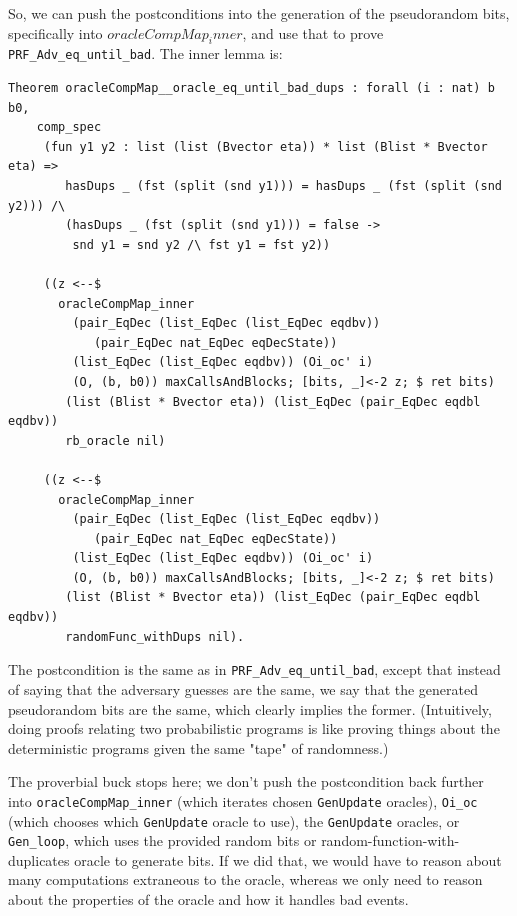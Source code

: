 \documentclass[12pt,lot, lof]{puthesis}
\newcommand{\li} {\lstinline}
\begin{document}
{So, we can push the postconditions into the generation of the pseudorandom bits, specifically into $oracleCompMap_inner$, and use that to prove \li|PRF_Adv_eq_until_bad|. The inner lemma is:

\begin{lstlisting}
Theorem oracleCompMap__oracle_eq_until_bad_dups : forall (i : nat) b b0,
    comp_spec
     (fun y1 y2 : list (list (Bvector eta)) * list (Blist * Bvector eta) =>
        hasDups _ (fst (split (snd y1))) = hasDups _ (fst (split (snd y2))) /\
        (hasDups _ (fst (split (snd y1))) = false ->
         snd y1 = snd y2 /\ fst y1 = fst y2))

     ((z <--$
       oracleCompMap_inner
         (pair_EqDec (list_EqDec (list_EqDec eqdbv))
            (pair_EqDec nat_EqDec eqDecState))
         (list_EqDec (list_EqDec eqdbv)) (Oi_oc' i) 
         (O, (b, b0)) maxCallsAndBlocks; [bits, _]<-2 z; $ ret bits)
        (list (Blist * Bvector eta)) (list_EqDec (pair_EqDec eqdbl eqdbv))
        rb_oracle nil)
         
     ((z <--$
       oracleCompMap_inner
         (pair_EqDec (list_EqDec (list_EqDec eqdbv))
            (pair_EqDec nat_EqDec eqDecState))
         (list_EqDec (list_EqDec eqdbv)) (Oi_oc' i) 
         (O, (b, b0)) maxCallsAndBlocks; [bits, _]<-2 z; $ ret bits)
        (list (Blist * Bvector eta)) (list_EqDec (pair_EqDec eqdbl eqdbv))
        randomFunc_withDups nil).
\end{lstlisting}        

The postcondition is the same as in \li|PRF_Adv_eq_until_bad|, except that instead of saying that the adversary guesses are the same, we say that the generated pseudorandom bits are the same, which clearly implies the former. (Intuitively, doing proofs relating two probabilistic programs is like proving things about the deterministic programs given the same "tape" of randomness.) 

The proverbial buck stops here; we don't push the postcondition back further into \li|oracleCompMap_inner| (which iterates chosen \li|GenUpdate| oracles), \li|Oi_oc| (which chooses which \li|GenUpdate| oracle to use), the \li|GenUpdate| oracles, or \li|Gen_loop|, which uses the provided random bits or random-function-with-duplicates oracle to generate bits. If we did that, we would have to reason about many computations extraneous to the oracle, whereas we only need to reason about the properties of the oracle and how it handles bad events.

}
\end{document}
